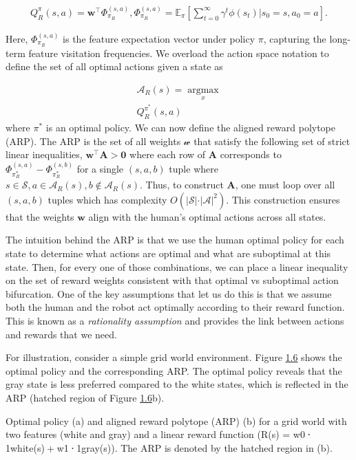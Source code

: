 \documentclass[
  letterpaper,
  DIV=11,
  numbers=noendperiod,
  oneside]{scrreprt}
\theoremstyle{remark}
\begin{document}
\[\begin{aligned}
    Q_R^\pi (s,a) = \mathbf{w}^\top \Phi_{\pi_R}^{(s,a)}, \Phi_{\pi_R}^{(s,a)} = \mathbb{E}_\pi [\sum_{t=0}^\infty \gamma^t \phi(s_t) \vert s_0 = s, a_0 = a].
\end{aligned}\]

Here, \(\Phi_{\pi_R}^{(s,a)}\) is the feature expectation vector under
policy \(\pi\), capturing the long-term feature visitation frequencies.
We overload the action space notation to define the set of all optimal
actions given a state as

\[\begin{aligned}
    \mathcal{A}_R(s) = \underset{x}{\operatorname{argmax}} \\ Q^{\pi^*}_R(s,a)
\end{aligned}\] where \(\pi^*\) is an optimal policy. We can now define
the aligned reward polytope (ARP). The ARP is the set of all weights
\(\mathcal{w}\) that satisfy the following set of strict linear
inequalities, \(\mathbf{w}^\top \mathbf{A}  > \mathbf{0}\) where each
row of \(\mathbf{A}\) corresponds to
\(\Phi_{\pi^*_R}^{(s,a)} - \Phi_{\pi^*_R}^{(s,b)}\) for a single
\((s,a,b)\) tuple where
\(s \in \mathcal{S}, a \in \mathcal{A}_R(s), b \notin \mathcal{A}_R(s)\).
Thus, to construct \(\mathbf{A}\), one must loop over all \((s,a,b)\)
tuples which has complexity
\(O(\vert \mathcal{S} \vert \cdot \vert \mathcal{A} \vert^2)\). This
construction ensures that the weights \(\mathbf{w}\) align with the
human's optimal actions across all states.

The intuition behind the ARP is that we use the human optimal policy for
each state to determine what actions are optimal and what are suboptimal
at this state. Then, for every one of those combinations, we can place a
linear inequality on the set of reward weights consistent with that
optimal vs suboptimal action bifurcation. One of the key assumptions
that let us do this is that we assume both the human and the robot act
optimally according to their reward function. This is known as a
\emph{rationality assumption} and provides the link between actions and
rewards that we need.

For illustration, consider a simple grid world environment. Figure
\hyperref[fig:toy]{1.6} shows the optimal policy and the corresponding
ARP. The optimal policy reveals that the gray state is less preferred
compared to the white states, which is reflected in the ARP (hatched
region of Figure \hyperref[fig:toy]{1.6}b).

Optimal policy (a) and aligned reward polytope (ARP) (b) for a grid
world with two features (white and gray) and a linear reward function
({R(s) = w0 ⋅ 1white(s) + w1 ⋅ 1gray(s)}). The ARP is denoted by the
hatched region in (b).
\end{document}
